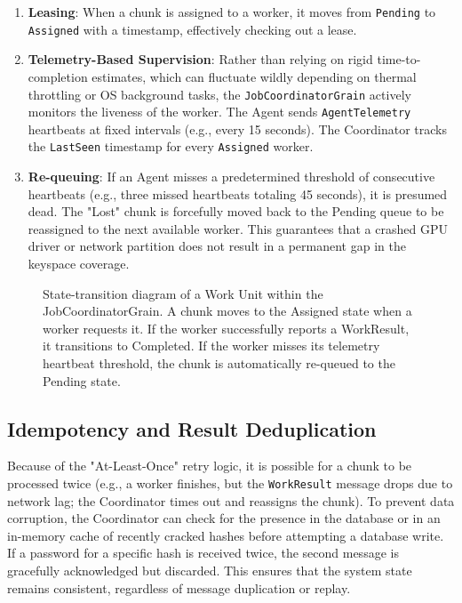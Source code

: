 \begin{enumerate}
    \item \textbf{Leasing}: When a chunk is assigned to a worker, it moves from \verb|Pending| to \verb|Assigned| with a timestamp, effectively checking out a lease.

    \item \textbf{Telemetry-Based Supervision}: Rather than relying on rigid time-to-completion estimates, which can fluctuate wildly depending on thermal throttling or OS background tasks, the \verb|JobCoordinatorGrain| actively monitors the liveness of the worker. The Agent sends \verb|AgentTelemetry| heartbeats at fixed intervals (e.g., every 15 seconds). The Coordinator tracks the \verb|LastSeen| timestamp for every \verb|Assigned| worker. 

    \item \textbf{Re-queuing}: If an Agent misses a predetermined threshold of consecutive heartbeats (e.g., three missed heartbeats totaling 45 seconds), it is presumed dead. The "Lost" chunk is forcefully moved back to the Pending queue to be reassigned to the next available worker. This guarantees that a crashed GPU driver or network partition does not result in a permanent gap in the keyspace coverage.
\end{enumerate}

\begin{figure}[H]
\centering

\caption{State-transition diagram of a Work Unit within the JobCoordinatorGrain. A chunk moves to the Assigned state when a worker requests it. If the worker successfully reports a WorkResult, it transitions to Completed. If the worker misses its telemetry heartbeat threshold, the chunk is automatically re-queued to the Pending state.}
\label{fig:distributed_checkpointing_state}
\end{figure}

\subsection{Idempotency and Result Deduplication}

Because of the "At-Least-Once" retry logic, it is possible for a chunk to be processed twice (e.g., a worker finishes, but the \verb|WorkResult| message drops due to network lag; the Coordinator times out and reassigns the chunk). To prevent data corruption, the Coordinator can check for the presence in the database or in an in-memory cache of recently cracked hashes before attempting a database write. If a password for a specific hash is received twice, the second message is gracefully acknowledged but discarded. This ensures that the system state remains consistent, regardless of message duplication or replay.

